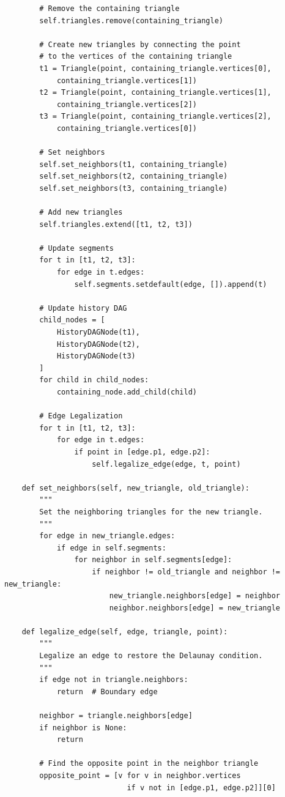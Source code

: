 \documentclass{article}
\begin{document}
\begin{verbatim}
        # Remove the containing triangle
        self.triangles.remove(containing_triangle)

        # Create new triangles by connecting the point 
        # to the vertices of the containing triangle
        t1 = Triangle(point, containing_triangle.vertices[0], 
            containing_triangle.vertices[1])
        t2 = Triangle(point, containing_triangle.vertices[1], 
            containing_triangle.vertices[2])
        t3 = Triangle(point, containing_triangle.vertices[2], 
            containing_triangle.vertices[0])

        # Set neighbors
        self.set_neighbors(t1, containing_triangle)
        self.set_neighbors(t2, containing_triangle)
        self.set_neighbors(t3, containing_triangle)

        # Add new triangles
        self.triangles.extend([t1, t2, t3])

        # Update segments
        for t in [t1, t2, t3]:
            for edge in t.edges:
                self.segments.setdefault(edge, []).append(t)

        # Update history DAG
        child_nodes = [
            HistoryDAGNode(t1),
            HistoryDAGNode(t2),
            HistoryDAGNode(t3)
        ]
        for child in child_nodes:
            containing_node.add_child(child)

        # Edge Legalization
        for t in [t1, t2, t3]:
            for edge in t.edges:
                if point in [edge.p1, edge.p2]:
                    self.legalize_edge(edge, t, point)

    def set_neighbors(self, new_triangle, old_triangle):
        """
        Set the neighboring triangles for the new triangle.
        """
        for edge in new_triangle.edges:
            if edge in self.segments:
                for neighbor in self.segments[edge]:
                    if neighbor != old_triangle and neighbor != new_triangle:
                        new_triangle.neighbors[edge] = neighbor
                        neighbor.neighbors[edge] = new_triangle

    def legalize_edge(self, edge, triangle, point):
        """
        Legalize an edge to restore the Delaunay condition.
        """
        if edge not in triangle.neighbors:
            return  # Boundary edge

        neighbor = triangle.neighbors[edge]
        if neighbor is None:
            return

        # Find the opposite point in the neighbor triangle
        opposite_point = [v for v in neighbor.vertices 
                            if v not in [edge.p1, edge.p2]][0]


\end{verbatim}
\end{document}
